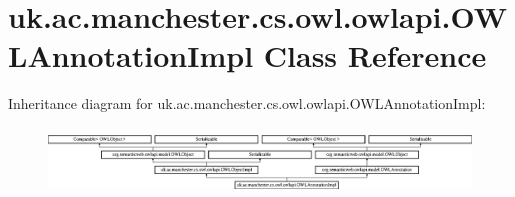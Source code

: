 \hypertarget{classuk_1_1ac_1_1manchester_1_1cs_1_1owl_1_1owlapi_1_1_o_w_l_annotation_impl}{\section{uk.\-ac.\-manchester.\-cs.\-owl.\-owlapi.\-O\-W\-L\-Annotation\-Impl Class Reference}
\label{classuk_1_1ac_1_1manchester_1_1cs_1_1owl_1_1owlapi_1_1_o_w_l_annotation_impl}
}
Inheritance diagram for uk.\-ac.\-manchester.\-cs.\-owl.\-owlapi.\-O\-W\-L\-Annotation\-Impl\-:\begin{figure}[H]
\begin{center}
\leavevmode
\includegraphics[height=1.783440cm]{classuk_1_1ac_1_1manchester_1_1cs_1_1owl_1_1owlapi_1_1_o_w_l_annotation_impl}
\end{center}
\end{figure}
